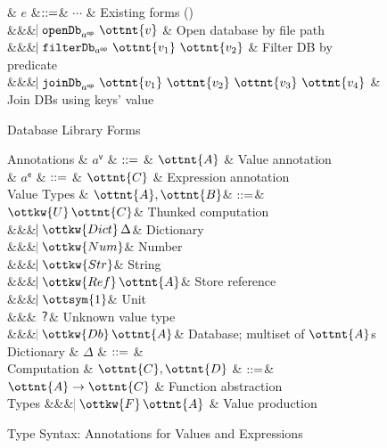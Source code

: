 \begin{figure}
  \begin{grammar}
  & $e$
    &$\mathrel{::=}$& $\cdots$ & Existing forms ()
    \\ &&& $\bnfaltbrk  \texttt{openDb}_{ a^{\textsf{op} } }~ \ottnt{v} $ & Open database by file path
    \\ &&& $\bnfaltbrk  \texttt{filterDb}_{ a^{\textsf{op} } }~ \ottnt{v_{{\mathrm{1}}}} ~ \ottnt{v_{{\mathrm{2}}}} $ & Filter DB by predicate
    \\ &&& $\bnfaltbrk  \texttt{joinDb}_{ a^{\textsf{op} } }~ \ottnt{v_{{\mathrm{1}}}} ~ \ottnt{v_{{\mathrm{2}}}} ~ \ottnt{v_{{\mathrm{3}}}} ~ \ottnt{v_{{\mathrm{4}}}} $ & Join DBs using keys' value
\end{grammar}
\caption{Database Library Forms}
\label{fig:db-syntax}
\end{figure}


\begin{figure}
\begin{grammar}
  Annotations
    & $a^\textsf{v}$ & $\mathrel{::=}$ & $\ottnt{A}$ & Value annotation
  \\
    & $a^\textsf{e}$ & $\mathrel{::=}$ & $\ottnt{C}$ & Expression annotation
  \\
  Value Types  & $\ottnt{A}, \ottnt{B}$& $\mathrel{::=}$& 
  $ \ottkw{U} \, \ottnt{C}$& Thunked computation
  \\ &&& $\bnfaltbrk \ottkw{Dict} \, \Delta$& Dictionary
  \\ &&& $\bnfaltbrk \ottkw{Num}$& Number
  \\ &&& $\bnfaltbrk \ottkw{Str}$& String
  \\ &&& $\bnfaltbrk \ottkw{Ref} \, \ottnt{A}$& Store reference
  \\ &&& $\bnfaltbrk \ottsym{1}$& Unit
  \\ &&& $\hspace{-1.02ex}\mathrel{\mid}  \textsf{?} $& Unknown value type
  \\ &&& $\bnfaltbrk \ottkw{Db} \, \ottnt{A}$& Database; multiset of $\ottnt{A}$s
  \\[2mm]
  Dictionary & $\Delta$ & $\mathrel{::=}$ & 
  \\[2mm]
  Computation & $\ottnt{C}, \ottnt{D}$ & $\mathrel{::=}$& 
  $\ottnt{A}  \rightarrow  \ottnt{C}$ & Function abstraction
  \\ 
  Types
  &&& $\bnfaltbrk \ottkw{F} \, \ottnt{A}$ & Value production
\end{grammar}
\caption{Type Syntax: Annotations for Values and Expressions}
\label{fig:types}
\end{figure}


